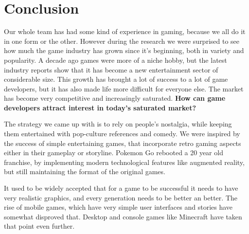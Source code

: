\documentclass[12p]{article}
\begin{document}

\newpage
\section{Conclusion}
Our whole team has had some kind of experience in gaming, because we all do it in one form or the other. However during the research we were surprised to see how much the game industry has grown since it's beginning, both in variety and popularity. A decade ago games were more of a niche hobby, but the latest industry reports show that it has become a new entertainment sector of considerable size.
This growth has brought a lot of success to a lot of game developers, but it has also made life more difficult for everyone else. The market has become very competitive and increasingly saturated.
\textbf{How can game developers attract interest in today’s saturated market?}

The strategy we came up with is to rely on people's nostalgia, while keeping them entertained with pop-culture references and comedy. We were inspired by the success of simple entertaining games, that incorporate retro gaming aspects either in their gameplay or storyline. Pokemon Go \cite{PokemonGO} rebooted a 20 year old franchise, by implementing modern technological features like augmented reality, but still maintaining the format of the original games.

It used to be widely accepted that for a game to be successful it needs to have very realistic graphics, and every generation needs to be better an better. The rise of mobile games, which have very simple user interfaces and stories have somewhat disproved that. Desktop and console games like Minecraft \cite{Minecraft} have taken that point even further.


\newpage
\printbibliography[heading=bibintoc,title={References}]

\end{document}
